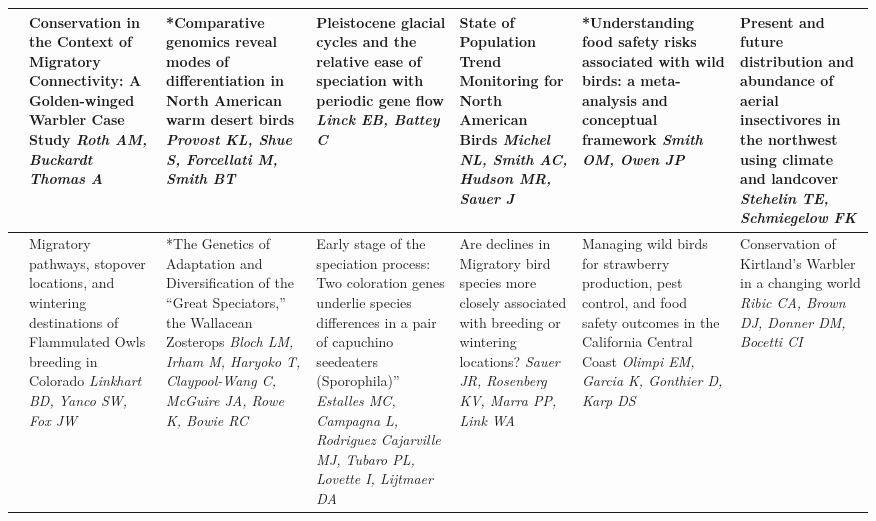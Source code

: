 \begin{tabular}{|x{0.75cm}|x{2.25cm}|x{2.25cm}|x{2.25cm}|a{2.25cm}|a{2.25cm}|a{2.25cm}|}
\hline
{}&Conservation in the Context of Migratory Connectivity: A Golden-winged Warbler Case Study \newline \newline \textit{Roth AM, Buckardt Thomas A} & *Comparative genomics reveal modes of differentiation in North American warm desert birds \newline \newline \textit{Provost KL, Shue S, Forcellati M, Smith BT} & Pleistocene glacial cycles and the relative ease of speciation with periodic gene flow \newline \newline \textit{Linck EB, Battey C} & State of Population Trend Monitoring for North American Birds \newline \newline \textit{Michel NL, Smith AC, Hudson MR, Sauer J} & *Understanding food safety risks associated with wild birds: a meta-analysis and conceptual framework \newline \newline \textit{Smith OM, Owen JP} & Present and future distribution and abundance of aerial insectivores in the northwest using climate and landcover \newline \newline \textit{Stehelin TE, Schmiegelow FK}\\
\hline
{}&Migratory pathways, stopover locations, and wintering destinations of Flammulated Owls breeding in Colorado \newline \newline \textit{Linkhart BD, Yanco SW, Fox JW} & *The Genetics of Adaptation and Diversification of the “Great Speciators,” the Wallacean Zosterops \newline \newline \textit{Bloch LM, Irham M, Haryoko T, Claypool-Wang C, McGuire JA, Rowe K, Bowie RC} & Early stage of the speciation process: Two coloration genes underlie species differences in a pair of capuchino seedeaters (Sporophila)” \newline \newline \textit{Estalles MC, Campagna L, Rodriguez Cajarville MJ, Tubaro PL, Lovette I, Lijtmaer DA} & Are declines in Migratory bird species more closely associated with breeding or wintering locations? \newline \newline \textit{Sauer JR, Rosenberg KV, Marra PP, Link WA} & Managing wild birds for strawberry production, pest control, and food safety outcomes in the California Central Coast \newline \newline \textit{Olimpi EM, Garcia K, Gonthier D, Karp DS} & Conservation of Kirtland’s Warbler in a changing world \newline \newline \textit{Ribic CA, Brown DJ, Donner DM, Bocetti CI}\\

\end{tabular}
